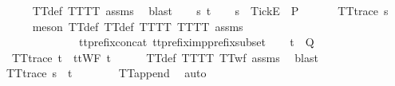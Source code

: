 \begin{isabellebody}
{\ \ \ \ \isamarkupfalse%
\ TT{}{\isacharunderscore}def\ TT{\isacharunderscore}TT{}\ assms{\isacharparenleft}{}{\isacharparenright}\ \isamarkupfalse%
\ blast\isanewline
{}\isamarkupfalse%
\isanewline
\ \ \isamarkupfalse%
\ s\ t\isanewline
\ \ \isamarkupfalse%
\ {\isachardoublequoteopen}s\ {\isacharat}\ {\isacharbrackleft}{\isacharbrackleft}Tick{\isacharbrackright}\isactrlsub E{\isacharbrackright}\ {\isasymin}\ P{\isachardoublequoteclose}\isanewline
\ \ \isamarkupfalse%
\ \isamarkupfalse%
\ {}{\isacharcolon}\ {\isachardoublequoteopen}TT{}{\isacharunderscore}trace\ s{\isachardoublequoteclose}\isanewline
\ \ \ \ \isamarkupfalse%
\ {\isacharparenleft}meson\ TT{}{\isacharunderscore}def\ TT{}{\isacharunderscore}def\ TT{\isacharunderscore}TT{}\ TT{\isacharunderscore}TT{}\ assms{\isacharparenleft}{}{\isacharparenright}\ \isanewline
\ \ \ \ \ \ \ \ \ \ \ \ \ \ tt{\isacharunderscore}prefix{\isacharunderscore}concat\ tt{\isacharunderscore}prefix{\isacharunderscore}imp{\isacharunderscore}prefix{\isacharunderscore}subset{\isacharparenright}\isanewline
\ \ \isamarkupfalse%
\ {\isachardoublequoteopen}t\ {\isasymin}\ Q{\isachardoublequoteclose}\isanewline
\ \ \isamarkupfalse%
\ \isamarkupfalse%
\ {}{\isacharcolon}\ {\isachardoublequoteopen}TT{}{\isacharunderscore}trace\ t\ {\isasymand}\ ttWF\ t{\isachardoublequoteclose}\isanewline
\ \ \ \ \isamarkupfalse%
\ TT{}{\isacharunderscore}def\ TT{\isacharunderscore}TT{}\ TT{\isacharunderscore}wf\ assms{\isacharparenleft}{}{\isacharparenright}\ \isamarkupfalse%
\ blast\isanewline
\ \ \isamarkupfalse%
\ {\isachardoublequoteopen}TT{}{\isacharunderscore}trace\ {\isacharparenleft}s\ {\isacharat}\ t{\isacharparenright}{\isachardoublequoteclose}\isanewline
\ \ \ \ \isamarkupfalse%
\ {}\ {}\ TT{}{\isacharunderscore}append\ \isamarkupfalse%
\ auto\isanewline
{}\isamarkupfalse%
%
\endisatagproof
{\isafoldproof}%
%
\isadelimproof
%
\endisadelimproof
%
}%
%
\end{isabellebody}

